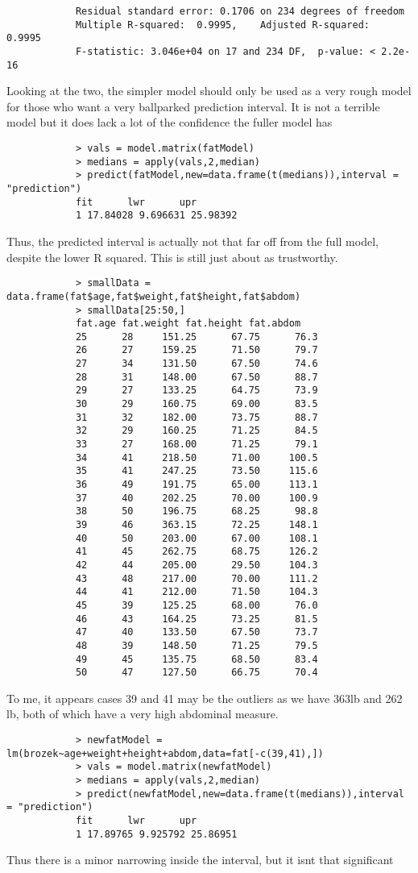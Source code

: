 \documentclass[12pt]{article}
\begin{document}
\begin{enumerate}
\begin{verbatim}
			Residual standard error: 0.1706 on 234 degrees of freedom
			Multiple R-squared:  0.9995,	Adjusted R-squared:  0.9995 
			F-statistic: 3.046e+04 on 17 and 234 DF,  p-value: < 2.2e-16
		\end{verbatim}
		Looking at the two, the simpler model should only be used as a very rough model for those who want a very ballparked prediction interval. It is not a terrible model but it does lack a lot of the confidence the fuller model has
		\begin{verbatim}
			> vals = model.matrix(fatModel)
			> medians = apply(vals,2,median)
			> predict(fatModel,new=data.frame(t(medians)),interval = "prediction")
			fit      lwr      upr
			1 17.84028 9.696631 25.98392
		\end{verbatim}
		Thus, the predicted interval is actually not that far off from the full model, despite the lower R squared.
		This is still just about as trustworthy.
		\begin{verbatim}
			> smallData = data.frame(fat$age,fat$weight,fat$height,fat$abdom)
			> smallData[25:50,]
			fat.age fat.weight fat.height fat.abdom
			25      28     151.25      67.75      76.3
			26      27     159.25      71.50      79.7
			27      34     131.50      67.50      74.6
			28      31     148.00      67.50      88.7
			29      27     133.25      64.75      73.9
			30      29     160.75      69.00      83.5
			31      32     182.00      73.75      88.7
			32      29     160.25      71.25      84.5
			33      27     168.00      71.25      79.1
			34      41     218.50      71.00     100.5
			35      41     247.25      73.50     115.6
			36      49     191.75      65.00     113.1
			37      40     202.25      70.00     100.9
			38      50     196.75      68.25      98.8
			39      46     363.15      72.25     148.1
			40      50     203.00      67.00     108.1
			41      45     262.75      68.75     126.2
			42      44     205.00      29.50     104.3
			43      48     217.00      70.00     111.2
			44      41     212.00      71.50     104.3
			45      39     125.25      68.00      76.0
			46      43     164.25      73.25      81.5
			47      40     133.50      67.50      73.7
			48      39     148.50      71.25      79.5
			49      45     135.75      68.50      83.4
			50      47     127.50      66.75      70.4
		\end{verbatim}
		To me, it appears cases 39 and 41 may be the outliers as we have 363lb and 262 lb, both of which have a very high abdominal measure.
		\begin{verbatim}
			> newfatModel = lm(brozek~age+weight+height+abdom,data=fat[-c(39,41),])
			> vals = model.matrix(newfatModel)
			> medians = apply(vals,2,median)
			> predict(newfatModel,new=data.frame(t(medians)),interval = "prediction")
			fit      lwr      upr
			1 17.89765 9.925792 25.86951
		\end{verbatim}
		Thus there is a minor narrowing inside the interval, but it isnt that significant
		

\end{enumerate}
\end{document}
